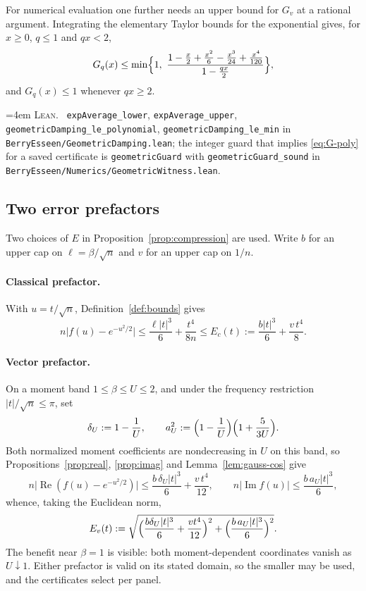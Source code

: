 \documentclass[10pt,a4paper]{article}
\theoremstyle{plain}
\theoremstyle{definition}
\newcommand{\lean}[1]{\texttt{#1}}
\newcommand{\file}[1]{\texttt{#1}}
\DeclareMathOperator{\Rea}{Re}
\DeclareMathOperator{\Ima}{Im}
\newenvironment{leanref}%
  {\par\addvspace{3pt}\begingroup\sloppy\emergencystretch=4em
   \noindent\footnotesize\textsc{Lean.}\ \ignorespaces}%
  {\par\endgroup\addvspace{3pt}}
\begin{document}
For numerical evaluation one further needs an upper bound for $G_v$ at a
rational argument. Integrating the elementary Taylor bounds for the exponential
gives, for $x\ge0$, $q\le1$ and $qx<2$,
\begin{equation}\label{eq:G-poly}
  G_q(x) \le \min\Bigl\{1,\
  \frac{1-\tfrac x2+\tfrac{x^2}{6}-\tfrac{x^3}{24}+\tfrac{x^4}{120}}
       {1-\tfrac{qx}{2}}\Bigr\},
\end{equation}
and $G_q(x)\le1$ whenever $qx\ge2$.

\begin{leanref}
\lean{expAverage\_lower}, \lean{expAverage\_upper},
\lean{geometricDamping\_le\_polynomial},
\lean{geometricDamping\_le\_min} in
\file{BerryEsseen/GeometricDamping.lean}; the integer guard that implies
\eqref{eq:G-poly} for a saved certificate is \lean{geometricGuard} with
\lean{geometricGuard\_sound} in
\file{BerryEsseen/Numerics/GeometricWitness.lean}.
\end{leanref}

\subsection{Two error prefactors}

Two choices of $E$ in Proposition~\ref{prop:compression} are used. Write
$b$ for an upper cap on $\ell=\beta/\sqrt n$ and $v$ for an upper cap on
$1/n$.

\paragraph{Classical prefactor.}
With $u=t/\sqrt n$, Definition~\ref{def:bounds} gives
\[
  n\bigl|f(u)-e^{-u^2/2}\bigr|
  \le \frac{\ell|t|^3}{6}+\frac{t^4}{8n}
  \le E_c(t) := \frac{b|t|^3}{6}+\frac{v\,t^4}{8} .
\]

\paragraph{Vector prefactor.}
On a moment band $1\le\beta\le U\le2$, and under the frequency restriction
$|t|/\sqrt n\le\pi$, set
\[
  \delta_U := 1-\frac1U,
  \qquad
  a_U^2 := \Bigl(1-\frac1U\Bigr)\Bigl(1+\frac{5}{3U}\Bigr).
\]
Both normalized moment coefficients are nondecreasing in $U$ on this band, so
Propositions~\ref{prop:real}, \ref{prop:imag} and
Lemma~\ref{lem:gauss-cos} give
\[
  n\bigl|\Rea(f(u)-e^{-u^2/2})\bigr| \le \frac{b\,\delta_U|t|^3}{6}
    + \frac{v\,t^4}{12},
  \qquad
  n\bigl|\Ima f(u)\bigr| \le \frac{b\,a_U|t|^3}{6},
\]
whence, taking the Euclidean norm,
\[
  E_v(t) := \sqrt{\Bigl(\frac{b\delta_U|t|^3}{6}+\frac{v t^4}{12}\Bigr)^2
    + \Bigl(\frac{b\,a_U|t|^3}{6}\Bigr)^2}.
\]
The benefit near $\beta=1$ is visible: both moment-dependent coordinates vanish
as $U\downarrow1$. Either prefactor is valid on its stated domain, so the
smaller may be used, and the certificates select per panel.
\end{document}
